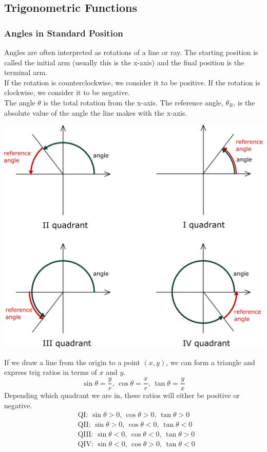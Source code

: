 \subsection{Trigonometric Functions}

\subsubsection{Angles in Standard Position}
Angles are often interpreted as rotations of a line or ray. The starting position is called the initial arm (usually this is the x-axis) and the final position is the terminal arm.\\
If the rotation is counterclockwise, we consider it to be positive. If the rotation is clockwise, we consider it to be negative.\\
The angle $\theta$ is the total rotation from the x-axis. The reference angle, $\theta_R$, is the absolute value of the angle the line makes with the x-axis.\\
\centerline{\includegraphics[scale=0.13]{PreCalcPictures/ReferenceAngle.png}}
If we draw a line from the origin to a point $(x,y)$, we can form a triangle and express trig ratios in terms of $x$ and $y$.
$$\sin\theta=\frac{y}{r},\,\cos\theta=\frac{x}{r},\,\tan\theta=\frac{y}{x}$$
Depending which quadrant we are in, these ratios will either be positive or negative.
\begin{align*}
    &\mathrm{QI:}\,\sin\theta>0,\,\cos\theta>0,\,\tan\theta>0\\
    &\mathrm{QII:}\,\sin\theta>0,\,\cos\theta<0,\,\tan\theta<0\\
    &\mathrm{QIII:}\,\sin\theta<0,\,\cos\theta<0,\,\tan\theta>0\\
    &\mathrm{QIV:}\,\sin\theta<0,\,\cos\theta>0,\,\tan\theta<0
\end{align*}

